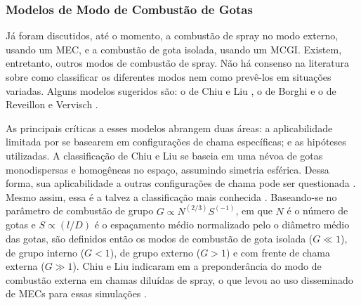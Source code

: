  



\subsubsection{Modelos de Modo de Combustão de Gotas}

Já foram discutidos, até o momento, a combustão de spray no modo externo, usando um MEC, e a combustão de gota isolada, usando um MCGI.
Existem, entretanto, outros modos de combustão de spray.
Não há consenso na literatura sobre como classificar os diferentes modos nem como prevê-los em situações variadas.
Alguns modelos sugeridos são: o de Chiu e Liu \cite{ChiuH1977,ChiuH1982}, o de Borghi \cite{Borghi1996} e o de Reveillon e Vervisch \cite{ReveillonJ2005}.%

As principais críticas a esses modelos abrangem duas áreas: a aplicabilidade limitada por se basearem em configurações de chama específicas; e as hipóteses utilizadas. 
A classificação de Chiu e Liu \cite{ChiuH1977,ChiuH1982} se baseia em uma névoa de gotas monodispersas e homogêneas no espaço, assumindo simetria esférica.
Dessa forma, sua aplicabilidade a outras configurações de chama pode ser questionada \cite{SacomanoF2017PhD}.
Mesmo assim, essa é a talvez a classificação mais conhecida \cite{JennyB2012}.
Baseando-se no parâmetro de combustão de grupo $G\propto N^{(2/3)} S^{(-1)}$, em que $N$ é o número de gotas e $S\propto (l/D)$ é o espaçamento médio normalizado pelo o diâmetro médio das gotas, 
são definidos então os modos de combustão de gota isolada ($G\ll1$), de grupo interno ($G<1$), de grupo externo ($G>1$) e com frente de chama externa ($G\gg1$).
Chiu e Liu indicaram em \cite{ChiuH1982} a preponderância do modo de combustão externa em chamas diluídas de spray, o que levou ao uso disseminado de MECs para essas simulações \cite{SacomanoF2017PhD}.

